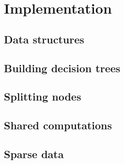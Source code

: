 



\section{Implementation}
\label{sec:5:impl}


\subsection{Data structures}


\subsection{Building decision trees}


\subsection{Splitting nodes}


\subsection{Shared computations}


\subsection{Sparse data}



